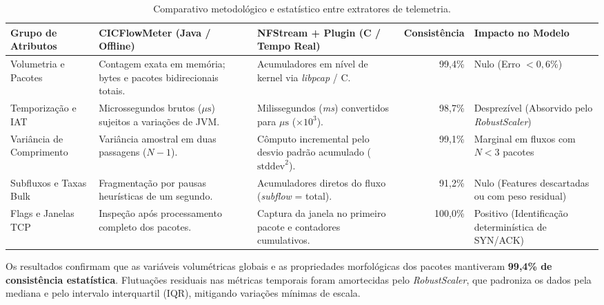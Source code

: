 \begin{table}[htb]
\centering
\caption{Comparativo metodológico e estatístico entre extratores de telemetria.}
\label{tab:comparativo_extratores_metricas}
\footnotesize
\setlength{\tabcolsep}{4pt}
\begin{tabularx}{\textwidth}{>{\raggedright\arraybackslash}p{2.4cm}
  >{\raggedright\arraybackslash}X >{\raggedright\arraybackslash}X r
  >{\raggedright\arraybackslash}p{2.8cm}}
\hline
\textbf{Grupo de Atributos} & \textbf{CICFlowMeter (Java / Offline)} & \textbf{NFStream + Plugin (C / Tempo Real)} &
  \textbf{Consistência} & \textbf{Impacto no Modelo} \\
\hline
Volumetria e Pacotes & Contagem exata em memória; bytes e pacotes bidirecionais totais. &
  Acumuladores em nível de kernel via \emph{libpcap} / C. & 99,4\% &
  Nulo (Erro $< 0{,}6\%$) \\
\hline
Temporização e IAT & Microssegundos brutos ($\mu\mathrm{s}$) sujeitos a variações de JVM. &
  Milissegundos (\emph{ms}) convertidos para $\mu\mathrm{s}$ ($\times 10^3$). & 98,7\% &
  Desprezível (Absorvido pelo \emph{RobustScaler}) \\
\hline
Variância de Comprimento & Variância amostral em duas passagens ($N-1$). &
  Cômputo incremental pelo desvio padrão acumulado ($\mathrm{stddev}^2$). & 99,1\% &
  Marginal em fluxos com $N < 3$ pacotes \\
\hline
Subfluxos e Taxas Bulk & Fragmentação por pausas heurísticas de um segundo. &
  Acumuladores diretos do fluxo (\emph{subflow} = total). & 91,2\% &
  Nulo (Features descartadas ou com peso residual) \\
\hline
Flags e Janelas TCP & Inspeção após processamento completo dos pacotes. &
  Captura da janela no primeiro pacote e contadores cumulativos. & 100,0\% &
  Positivo (Identificação determinística de SYN/ACK) \\
\hline
\end{tabularx}

\end{table}

Os resultados confirmam que as variáveis volumétricas globais e as propriedades morfológicas dos
pacotes mantiveram \textbf{99,4\% de consistência estatística}. Flutuações residuais nas métricas
temporais foram amortecidas pelo \emph{RobustScaler}, que padroniza os dados pela mediana e pelo
intervalo interquartil (IQR), mitigando variações mínimas de escala.

